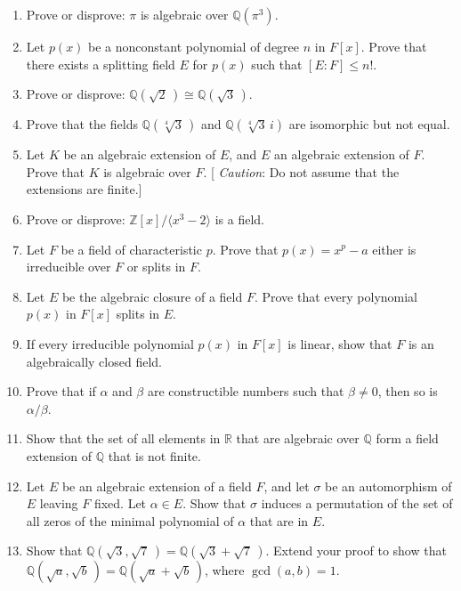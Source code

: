 {\begin{enumerate}
\item
Prove or disprove: $\pi$ is algebraic over ${\mathbb Q}(\pi^3)$.


\item
Let $p(x)$ be a nonconstant polynomial of degree $n$ in $F[x]$.  Prove
that there exists a splitting field $E$ for $p(x)$ such that $[E : F]
\leq n!$. 


\item
Prove or disprove: ${\mathbb Q}( \sqrt{2}\, ) \cong {\mathbb Q}( \sqrt{3}\, )$.


\item
Prove that the fields ${\mathbb Q}(\sqrt[4]{3}\, )$ and ${\mathbb
Q}(\sqrt[4]{3}\, i)$ are isomorphic but not equal.


\item
Let $K$ be an algebraic extension of $E$, and $E$ an algebraic
extension of $F$. Prove that $K$ is algebraic over $F$. [{\em
Caution}: Do not assume that the extensions are finite.]


\item
Prove or disprove: ${\mathbb Z}[x] / \langle x^3 -2 \rangle$ is a field.


\item
Let $F$ be a field of characteristic $p$. Prove that $p(x) = x^p - a$
either is irreducible over $F$ or splits in $F$. 


\item
Let $E$ be the algebraic closure of a field $F$. Prove that every
polynomial $p(x)$ in $F[x]$ splits in $E$.


\item
If every irreducible polynomial $p(x)$ in $F[x]$ is linear, show that
$F$ is an algebraically closed field.


\item
Prove that if $\alpha$ and $\beta$ are constructible numbers such that
$\beta \neq 0$, then so is $\alpha / \beta$. 


\item
Show that the set of all elements in ${\mathbb R}$ that are algebraic 
over ${\mathbb Q}$ form a field extension of ${\mathbb Q}$ that is not
finite. 

 
\item
Let $E$ be an algebraic extension of a field $F$, and let $\sigma$ be
an automorphism of $E$ leaving $F$ fixed. Let $\alpha \in E$. Show
that $\sigma$ induces a permutation of the set of all zeros of the
minimal polynomial of $\alpha$ that are in $E$. 

 
\item
Show that ${\mathbb Q}( \sqrt{3}, \sqrt{7}\, ) = {\mathbb Q}( \sqrt{3} +
\sqrt{7}\, )$.  Extend your proof to show that ${\mathbb Q}( \sqrt{a},
\sqrt{b}\, ) = {\mathbb Q}( \sqrt{a} + \sqrt{b}\, )$, where $\gcd(a, b) = 1$.
 


\end{enumerate}}
